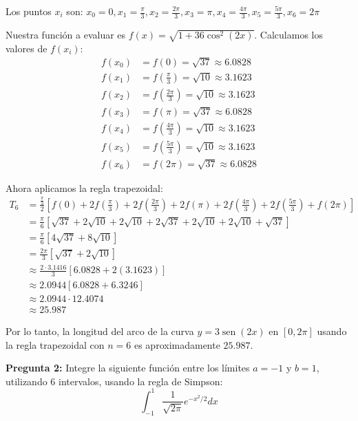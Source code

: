 \documentclass[12pt]{article}
\begin{document}
\begin{enumerate}
    Los puntos $x_i$ son:
    $x_0 = 0, x_1 = \frac{\pi}{3}, x_2 = \frac{2\pi}{3}, x_3 = \pi, x_4 = \frac{4\pi}{3}, x_5 = \frac{5\pi}{3}, x_6 = 2\pi$

    Nuestra función a evaluar es $f(x) = \sqrt{1 + 36\cos^2(2x)}$. Calculamos los valores de $f(x_i)$:
    \begin{align*}
        f(x_0) &= f(0) = \sqrt{37} \approx 6.0828 \\
        f(x_1) &= f(\frac{\pi}{3}) = \sqrt{10} \approx 3.1623 \\
        f(x_2) &= f(\frac{2\pi}{3}) = \sqrt{10} \approx 3.1623 \\
        f(x_3) &= f(\pi) = \sqrt{37} \approx 6.0828 \\
        f(x_4) &= f(\frac{4\pi}{3}) = \sqrt{10} \approx 3.1623 \\
        f(x_5) &= f(\frac{5\pi}{3}) = \sqrt{10} \approx 3.1623 \\
        f(x_6) &= f(2\pi) = \sqrt{37} \approx 6.0828
    \end{align*}

    Ahora aplicamos la regla trapezoidal:
    \begin{align*}
        T_6 &= \frac{\frac{\pi}{3}}{2} \left[ f(0) + 2f(\frac{\pi}{3}) + 2f(\frac{2\pi}{3}) + 2f(\pi) + 2f(\frac{4\pi}{3}) + 2f(\frac{5\pi}{3}) + f(2\pi) \right] \\
        &= \frac{\pi}{6} \left[ \sqrt{37} + 2\sqrt{10} + 2\sqrt{10} + 2\sqrt{37} + 2\sqrt{10} + 2\sqrt{10} + \sqrt{37} \right] \\
        &= \frac{\pi}{6} \left[ 4\sqrt{37} + 8\sqrt{10} \right] \\
        &= \frac{2\pi}{3} \left[ \sqrt{37} + 2\sqrt{10} \right] \\
        &\approx \frac{2 \cdot 3.1416}{3} [6.0828 + 2(3.1623)] \\
        &\approx 2.0944 [6.0828 + 6.3246] \\
        &\approx 2.0944 \cdot 12.4074 \\
        &\approx 25.987
    \end{align*}

    Por lo tanto, la longitud del arco de la curva $y = 3\operatorname{sen}(2x)$ en $[0, 2\pi]$ usando la regla trapezoidal con $n = 6$ es aproximadamente $25.987$.
\end{enumerate}

\textbf{Pregunta 2:} Integre la siguiente función entre los límites $a=-1$ y $b=1$, utilizando 6 intervalos, usando la regla de Simpson:
\[
\int_{-1}^{1} \frac{1}{\sqrt{2\pi}} e^{-x^2/2} dx
\]
\end{document}
